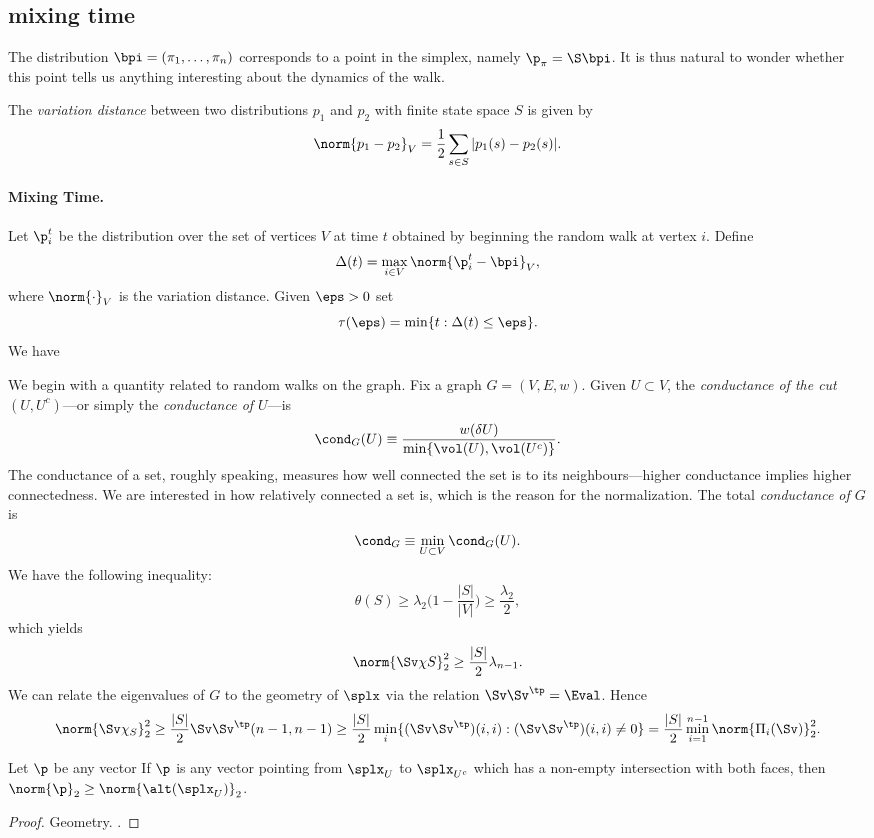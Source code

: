 \subsection{mixing time}
The distribution $\bpi=(\pi_1,\dots,\pi_n)$ corresponds to a point in the simplex, namely $\p_\pi=\S\bpi$. It is thus natural to wonder whether this point tells us anything interesting about the dynamics of the walk. 

The \emph{variation distance} between two distributions $p_1$ and $p_2$ with finite state space $S$ is given by 
\[\norm{p_1-p_2}_V = \frac{1}{2}\sum_{s\in S} |p_1(s)-p_2(s)|.\]

\paragraph{Mixing Time.} Let $\p_i^t$ be the distribution over the set of vertices $V$ at time $t$ obtained by beginning the random walk at vertex $i$. Define 
\[\Delta(t) = \max_{i\in V}\norm{\p_i^t-\bpi}_V,\]
where $\norm{\cdot}_V$ is the variation distance. Given $\eps>0$ set 
\[\tau(\eps) = \min\{t:\Delta(t)\leq \eps\}.\]
We have 

We begin with a quantity related to random walks on the graph. Fix a graph $G=(V,E,w)$. Given $U\subset V$, the \emph{conductance of the cut $(U,U^c)$}---or simply the \emph{conductance of $U$}---is 
\begin{equation*}
\cond_G(U) \equiv \frac{w(\delta U)}{\min\{\vol(U),\vol(U^c)\}}.
\end{equation*}
The  conductance of a set, roughly speaking, measures how well connected the set is to its neighbours---higher conductance implies higher connectedness. We are interested in how  relatively  connected a set  is,  which is the reason for the normalization. The total \emph{conductance of $G$} is 
\begin{equation*}
\cond_G \equiv \min_{U\subset V}\cond_G(U). 
\end{equation*}
We have the following inequality: 
\[\theta(S)\geq \lambda_2\bigg(1-\frac{|S|}{|V|}\bigg)\geq \frac{\lambda_2}{2},\]
which yields 
\[\norm{\Sv \chi S}_2^2 \geq \frac{|S|}{2}\lambda_{n-1}.\]
We can relate the eigenvalues of $G$ to the geometry of $\splx$ via the relation $\Sv\Sv^\tp = \Eval$. Hence
\[\norm{\Sv \chi_S}_2^2 \geq \frac{|S|}{2} \Sv\Sv^\tp (n-1,n-1)\geq \frac{|S|}{2} \min_{i}\{(\Sv\Sv^\tp)(i,i):(\Sv\Sv^\tp)(i,i)\neq 0\} = \frac{|S|}{2}\min_{i=1}^{n-1} \norm{\Pi_i(\Sv)}_2^2.  \]


\begin{observation}
	Let $\p$ be any vector 
	If $\p$ is any vector pointing from $\splx_U$ to $\splx_{U^c}$ which has a non-empty intersection with both faces, then $\norm{\p}_2 \geq \norm{\alt(\splx_U)}_2$. 
\end{observation}
\begin{proof}
	Geometry. . 
\end{proof}




